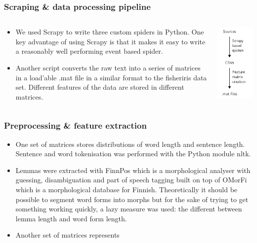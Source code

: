 \documentclass{beamer}
\begin{document}
\begin{frame}
  \frametitle{Scraping \& data processing pipeline}
  \begin{columns}[onlytextwidth]
    \begin{column}{0.7\textwidth}
      \begin{itemize}
        \item We used Scrapy to write three custom spiders in Python. One key
          advantage of using Scrapy is that it makes it easy to write a reasonably
          well performing event based spider.\pause{}
        \item Another script converts the raw text into a series of matrices in a
          load'able .mat file in a similar format to the fisheriris data set.
          Different features of the data are stored in different matrices.
      \end{itemize}
    \end{column}
    \begin{column}{0.3\textwidth}
    \includegraphics{pipeline.pdf}
    \end{column}
\end{columns}
\end{frame}

\begin{frame}
  \frametitle{Preprocessing \& feature extraction}
  \begin{itemize}
    \item One set of matrices stores distributions of word length and sentence
      length. Sentence and word tokenisation was performed with the Python
      module nltk.
    \item Lemmas were extracted with FinnPos which is a morphological analyser
      with guessing, disambiguation and part of speech tagging built on top of
      OMorFi which is a morphological database for Finnish. Theoretically it
      should be possible to segment word forms into morphs but for the sake of
      trying to get something working quickly, a lazy measure was used: the
      different between lemma length and word form length.
    \item Another set of matrices represents 
  \end{itemize}
\end{frame}
\end{document}
